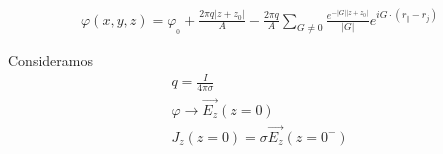 \documentclass[a4paper,11pt,]{book}
\begin{document}
\begin{eqnarray}
\varphi(x,y,z)= \varphi_{_{0}} +\frac{2\pi q\vert z+z_0 \vert}{A}  - \frac{2\pi q}{A}\displaystyle\sum_{G\neq 0}  \frac{ e^{-\vert G \vert \vert z+z_0 \vert} }{\vert G \vert} e^{i G \cdot(r_{\Vert}-r_{j})}
\end{eqnarray}

Consideramos 
\begin{eqnarray}
q = \frac{I}{4\pi \sigma}\\
\varphi\rightarrow \vec{E_z}(z=0)\\
J_z(z=0)=\sigma \vec{E_z}(z=0^-)
\end{eqnarray}
\end{document}
